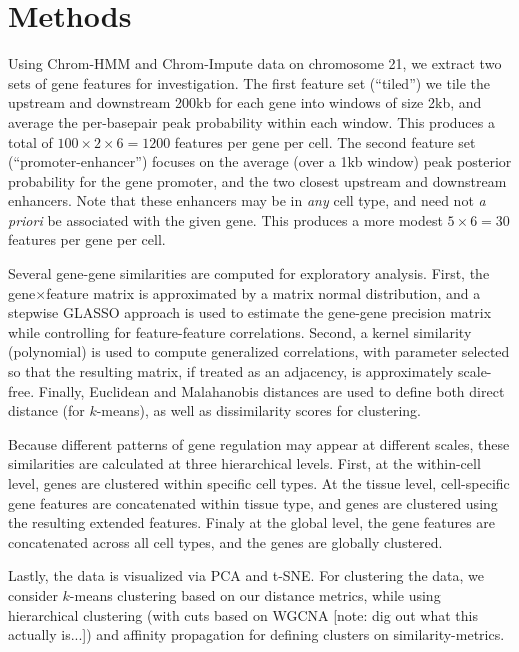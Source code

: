 \documentclass[9pt,twocolumn]{article}
\begin{document}
\section*{Methods}

Using Chrom-HMM\cite{chrom-hmm} and Chrom-Impute\cite{chrom-impute} data on chromosome 21, we extract two sets of gene features for investigation. The first feature set (``tiled'') we tile the upstream and downstream 200kb for each gene into windows of size 2kb, and average the per-basepair peak probability within each window. This produces a total of $100 \times 2 \times 6 = 1200$ features per gene per cell. The second feature set (``promoter-enhancer'') focuses on the average (over a 1kb window) peak posterior probability for the gene promoter, and the two closest upstream and downstream enhancers. Note that these enhancers may be in \textit{any} cell type, and need not \textit{a priori} be associated with the given gene. This produces a more modest $5 \times 6 = 30$ features per gene per cell.

Several gene-gene similarities are computed for exploratory analysis. First, the gene$\times$feature matrix is approximated by a matrix normal distribution, and a stepwise GLASSO approach\cite{yinliglasso} is used to estimate the gene-gene precision matrix while controlling for feature-feature correlations. Second, a kernel similarity (polynomial) is used to compute generalized correlations, with parameter selected so that the resulting matrix, if treated as an adjacency, is approximately scale-free\cite{wgcna}. Finally, Euclidean and Malahanobis distances are used to define both direct distance (for $k$-means), as well as dissimilarity scores for clustering.

Because different patterns of gene regulation may appear at different scales, these similarities are calculated at three hierarchical levels. First, at the within-cell level, genes are clustered within specific cell types. At the tissue level, cell-specific gene features are concatenated within tissue type, and genes are clustered using the resulting extended features. Finaly at the global level, the gene features are concatenated across all cell types, and the genes are globally clustered.

Lastly, the data is visualized via PCA and t-SNE\cite{tsne}. For clustering the data, we consider $k$-means\cite{kmeans} clustering based on our distance metrics, while using hierarchical clustering (with cuts based on WGCNA [note: dig out what this actually is...]) and affinity propagation\cite{affinity} for defining clusters on similarity-metrics.
\end{document}
